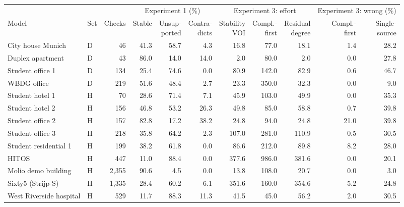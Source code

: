 \begin{tabular}{@{}llrrrrrrrrr@{}}
\toprule
 & & & \multicolumn{3}{c}{Experiment 1 (\%)} & \multicolumn{3}{c}{Experiment 3: effort} & \multicolumn{2}{c}{Experiment 3: wrong (\%)} \\
\cmidrule(lr){4-6}\cmidrule(lr){7-9}\cmidrule(l){10-11}
Model & Set & Checks & Stable & \shortstack{Unsup-\\ported} & \shortstack{Contra-\\dicts} & \shortstack{Stability\\VOI} & \shortstack{Compl.-\\first} & \shortstack{Residual\\degree} & \shortstack{Compl.-\\first} & \shortstack{Single-\\source} \\
\midrule
City house Munich & D & 46 & 41.3 & 58.7 & 4.3 & 16.8 & 77.0 & 18.1 & 1.4 & 28.2 \\
Duplex apartment & D & 43 & 86.0 & 14.0 & 14.0 & 2.0 & 80.0 & 2.0 & 0.0 & 27.8 \\
Student office 1 & D & 134 & 25.4 & 74.6 & 0.0 & 80.9 & 142.0 & 82.9 & 0.6 & 46.7 \\
WBDG office & D & 219 & 51.6 & 48.4 & 2.7 & 23.3 & 350.0 & 32.3 & 0.0 & 9.0 \\
\addlinespace
Student hotel 1 & H & 70 & 28.6 & 71.4 & 7.1 & 45.9 & 103.0 & 49.9 & 0.0 & 35.3 \\
Student hotel 2 & H & 156 & 46.8 & 53.2 & 26.3 & 49.8 & 85.0 & 58.8 & 0.7 & 39.8 \\
Student office 2 & H & 157 & 82.8 & 17.2 & 38.2 & 24.8 & 94.0 & 24.8 & 21.0 & 39.8 \\
Student office 3 & H & 218 & 35.8 & 64.2 & 2.3 & 107.0 & 281.0 & 110.9 & 0.5 & 30.5 \\
Student residential 1 & H & 199 & 38.2 & 61.8 & 0.0 & 86.6 & 212.0 & 89.8 & 8.2 & 28.0 \\
HITOS & H & 447 & 11.0 & 88.4 & 0.0 & 377.6 & 986.0 & 381.6 & 0.0 & 20.1 \\
Molio demo building & H & 2,355 & 90.6 & 4.5 & 0.0 & 13.8 & 108.0 & 20.7 & 0.0 & 3.0 \\
Sixty5 (Strijp-S) & H & 1,335 & 28.4 & 60.2 & 6.1 & 351.6 & 160.0 & 354.6 & 5.2 & 24.8 \\
West Riverside hospital & H & 529 & 11.7 & 88.3 & 11.3 & 41.5 & 45.0 & 56.2 & 2.0 & 30.5 \\
\bottomrule
\end{tabular}
